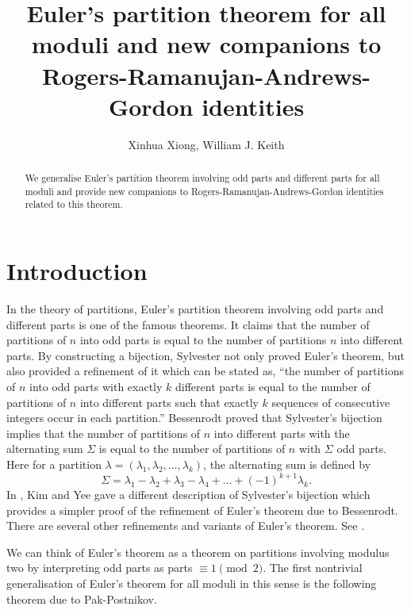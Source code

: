 \documentclass{amsart}
\begin{document}
\title{Euler's partition theorem for all moduli and new companions to Rogers-Ramanujan-Andrews-Gordon identities}
\author{Xinhua Xiong, William J. Keith}
\maketitle

\begin{abstract}
We generalise Euler's partition theorem involving odd parts and different parts for all moduli and provide new companions to Rogers-Ramanujan-Andrews-Gordon identities related to this theorem.
\end{abstract}

\section{Introduction}
In the theory of partitions, Euler's partition theorem involving odd parts and different parts is one of the famous theorems. It claims that the number of partitions of $n$ into odd parts is equal to  the number of partitions $n$ into different parts. By constructing a bijection, Sylvester \cite{Syl82} not only proved Euler's theorem, but also provided a refinement of it which can be stated as, ``the number of partitions of $n$ into odd parts with exactly $k$ different parts is equal to the number of partitions of $n$ into different parts such that exactly $k$ sequences of consecutive integers occur in each partition.''  Bessenrodt  \cite{bes94} proved that Sylvester's bijection implies that the number of partitions of $n$ into different parts with the alternating sum $\Sigma$ is equal to the number of partitions of $n$ with $\Sigma$ odd parts. Here for a partition $\lambda=(\lambda_1,\lambda_2,\dots,\lambda_{k})$, the alternating sum is defined by 
\begin{equation}
\Sigma=\lambda_{1}-\lambda_{2}+\lambda_{3}-\lambda_{4}+\dots+(-1)^{k+1}\lambda_{k}.\label{alternating}
\end{equation}
 In \cite{Kim-Yee}, Kim and Yee gave a different description of Sylvester's bijection which provides a simpler proof of the refinement of Euler's theorem due to Bessenrodt. There are several other refinements and variants of Euler's theorem. See \cite{All3,AndrewsEuler,Ber1,Ber2, Ber3, Pak, Yee2001,Yee2002}.

We can think of Euler's theorem as a theorem on partitions involving modulus two by interpreting odd parts as parts $\equiv 1\pmod 2.$  The first nontrivial generalisation of Euler's theorem for all moduli in this sense is the following theorem due to Pak-Postnikov.
\end{document}

